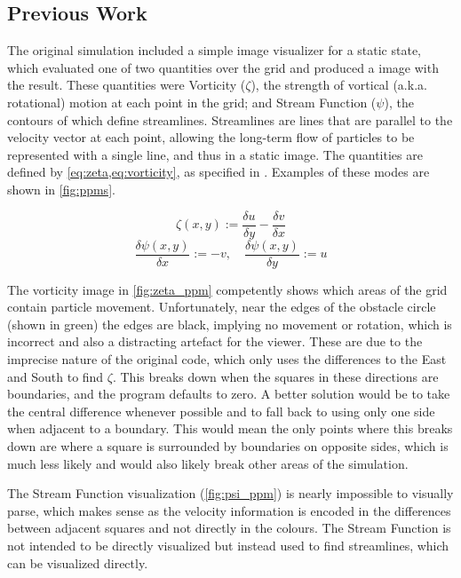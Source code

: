 \subsection{Previous Work}\label{sec:Research:Viz:ACA}
The original simulation\cite{modules:CS257Coursework} included a simple image visualizer for a static state, which evaluated one of two quantities over the grid and produced a  image with the result.
These quantities were Vorticity ($\zeta$), the strength of vortical (a.k.a. rotational) motion at each point in the grid; and Stream Function ($\psi$), the contours of which define streamlines.
Streamlines are lines that are parallel to the velocity vector at each point, allowing the long-term flow of particles to be represented with a single line, and thus in a static image.\cite{NASADefinitionStreamlines}
The quantities are defined by \cref{eq:zeta,eq:vorticity}, as specified in \cite{book:griebel1998numerical}.
Examples of these modes are shown in \cref{fig:ppms}.

\begin{equation}
    \zeta(x,y) := \frac{\delta{u}}{\delta{y}} - \frac{\delta{v}}{\delta{x}}
    \label{eq:zeta}
\end{equation}
\begin{equation}
    \frac{\delta{\psi}(x,y)}{\delta{x}} := -v,\quad \frac{\delta{\psi}(x,y)}{\delta{y}} := u
    \label{eq:vorticity}
\end{equation}


The vorticity image in \cref{fig:zeta_ppm} competently shows which areas of the grid contain particle movement.
Unfortunately, near the edges of the obstacle circle (shown in green) the edges are black, implying no movement or rotation, which is incorrect and also a distracting artefact for the viewer.
These are due to the imprecise nature of the original code, which only uses the differences to the East and South to find $\zeta$.
This breaks down when the squares in these directions are boundaries, and the program defaults to zero.
A better solution would be to take the central difference whenever possible and to fall back to using only one side when adjacent to a boundary.
This would mean the only points where this breaks down are where a square is surrounded by boundaries on opposite sides, which is much less likely and would also likely break other areas of the simulation.

The Stream Function visualization (\cref{fig:psi_ppm}) is nearly impossible to visually parse, which makes sense as the velocity information is encoded in the differences between adjacent squares and not directly in the colours.
The Stream Function is not intended to be directly visualized but instead used to find streamlines, which can be visualized directly.

